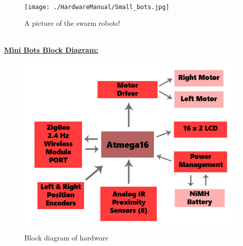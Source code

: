 \documentclass[a4paper,12pt,oneside]{book}
\begin{document}
	\hfill\\
	\begin{figure}[h!]
		\caption{A picture of the swarm robots!}
		\texttt{[image: ./HardwareManual/Small\_bots.jpg]}		
	\end{figure}	
	\hfill\\

	\underline{\textbf{\Large{Mini Bots Block Diagram:}}}
	\hfill\\
	\begin{figure}[h!]
		\caption{Block diagram of hardware}
		\includegraphics[width=\textwidth]{./Block_Diagram.jpg}
	\end{figure}
		
	\hfill\\
	
\end{document}
